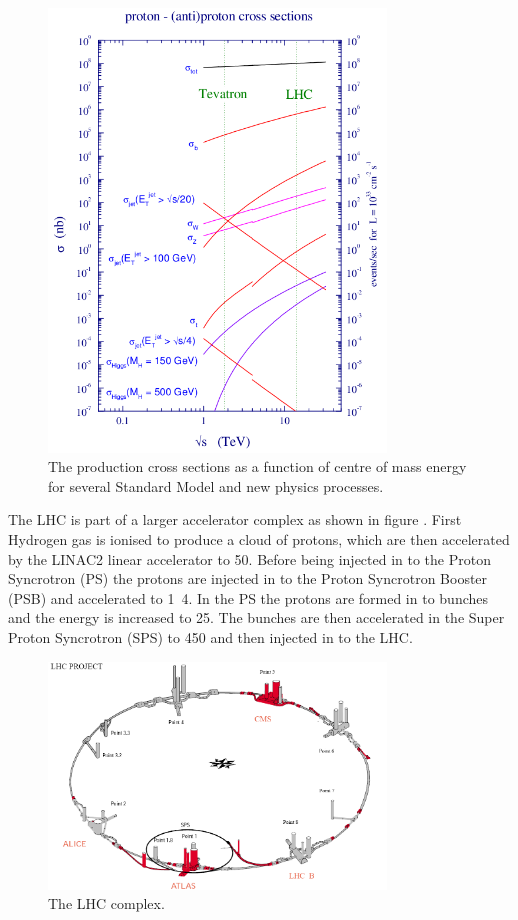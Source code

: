 \begin{figure}[htb!]
  \centering
  \includegraphics[width=0.8\textwidth]{xsec.png}
  \caption{The production cross sections as a function of centre of mass energy
for several Standard Model and new physics processes.}
  \label{fig:LHCxsec}
\end{figure}

The LHC is part of a larger accelerator complex as shown in figure
. First Hydrogen gas is ionised to produce a cloud of
protons, which are then accelerated by the LINAC2 linear accelerator to
\unit{50}{\MeV}.
Before being injected in to the Proton Syncrotron (PS) the protons are injected in to
the Proton Syncrotron Booster (PSB) and accelerated to \unit{1.4}{\GeV}. In the
PS the protons are formed in to bunches and the energy is increased to
\unit{25}{\GeV}. The bunches are then accelerated in the Super Proton
Syncrotron (SPS) to \unit{450}{\GeV} and then injected in to the LHC.


\begin{figure}[htb!]
  \centering
  \includegraphics[width=0.8\textwidth]{LHC}
  \caption{The LHC complex.}
  \label{fig:LHCcomplex}
\end{figure}

